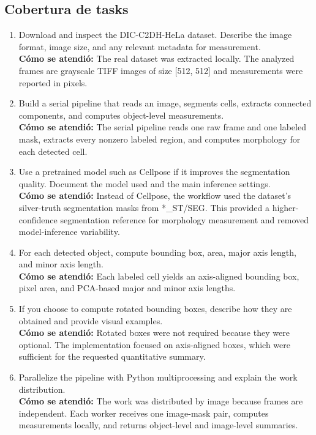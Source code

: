 \documentclass[11pt]{article}
\begin{document}
\subsection*{Cobertura de tasks}
\begin{enumerate}[leftmargin=*]
\item Download and inspect the DIC-C2DH-HeLa dataset. Describe the image format, image size, and any relevant metadata for measurement.\\
\textbf{Cómo se atendió:} The real dataset was extracted locally. The analyzed frames are grayscale TIFF images of size [512, 512] and measurements were reported in pixels.
\item Build a serial pipeline that reads an image, segments cells, extracts connected components, and computes object-level measurements.\\
\textbf{Cómo se atendió:} The serial pipeline reads one raw frame and one labeled mask, extracts every nonzero labeled region, and computes morphology for each detected cell.
\item Use a pretrained model such as Cellpose if it improves the segmentation quality. Document the model used and the main inference settings.\\
\textbf{Cómo se atendió:} Instead of Cellpose, the workflow used the dataset's silver-truth segmentation masks from *\_ST/SEG. This provided a higher-confidence segmentation reference for morphology measurement and removed model-inference variability.
\item For each detected object, compute bounding box, area, major axis length, and minor axis length.\\
\textbf{Cómo se atendió:} Each labeled cell yields an axis-aligned bounding box, pixel area, and PCA-based major and minor axis lengths.
\item If you choose to compute rotated bounding boxes, describe how they are obtained and provide visual examples.\\
\textbf{Cómo se atendió:} Rotated boxes were not required because they were optional. The implementation focused on axis-aligned boxes, which were sufficient for the requested quantitative summary.
\item Parallelize the pipeline with Python multiprocessing and explain the work distribution.\\
\textbf{Cómo se atendió:} The work was distributed by image because frames are independent. Each worker receives one image-mask pair, computes measurements locally, and returns object-level and image-level summaries.

\end{enumerate}
\end{document}
